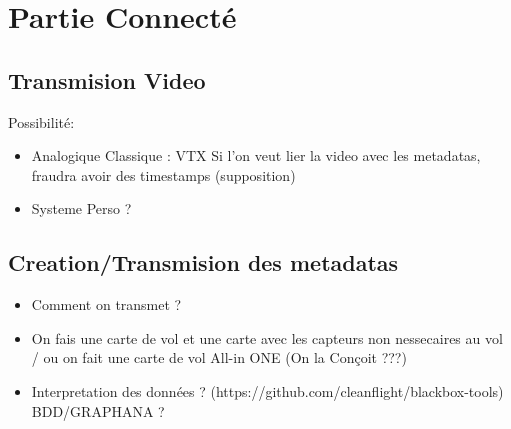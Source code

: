 \documentclass{article}
\begin{document}
\section{Partie Connecté}
\subsection{Transmision Video}
Possibilité: \\
\begin{itemize}
    \item Analogique Classique  :  VTX 
    \subitem Si l'on veut lier la video avec les metadatas, fraudra avoir des timestamps (supposition)
    \item Systeme Perso ? 
    
\end{itemize}
\subsection{Creation/Transmision des metadatas}
\begin{itemize}
    \item Comment on transmet ?
    \item On fais une carte de vol et une carte avec les capteurs non nessecaires au vol / ou on fait une carte de vol All-in ONE (On la Conçoit ???)
    \item Interpretation des données ? (https://github.com/cleanflight/blackbox-tools) BDD/GRAPHANA ?
\end{itemize}
\end{document}
